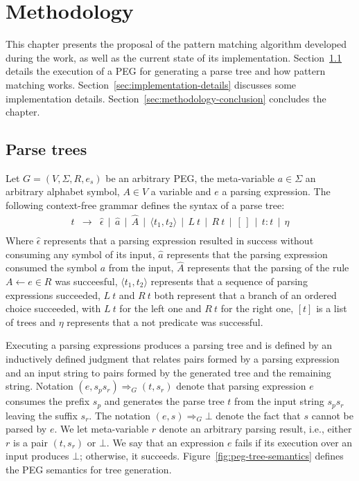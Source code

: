 \chapter{Methodology}\label{chap:methodology}

This chapter presents the proposal of the pattern matching algorithm developed
during the work, as well as the  current state of its implementation.
Section~\ref{sec:parse-tress} details
the execution of a PEG for generating a parse tree and how pattern matching works.
Section~\ref{sec:implementation-details} discusses some implementation details.
Section~\ref{sec:methodology-conclusion} concludes the chapter.

\section{Parse trees}\label{sec:parse-tress}

Let \(G = (V, \Sigma, R, e_s)\) be an arbitrary PEG, the meta-variable \(a \in \Sigma\) an
arbitrary alphabet symbol, \(A \in V\) a variable and \(e\) a parsing expression.
The following context-free grammar defines the syntax of a parse tree:
\[
   \begin{array}{lcl}
      t & \to & \hat{\epsilon} \, \mid \, \hat{a} \, \mid \, \hat{A} \,
                    \mid \, \langle t_1, t_2 \rangle\,
                    \mid \, L \: t \, \mid \, R \: t \, \mid \, [\,] \,\mid\,t:t\,
                    \mid \, \eta \\
   \end{array}
\]
Where \(\hat{\epsilon}\) represents that a parsing expression resulted in
success without consuming any symbol of its input, \(\hat{a}\) represents that
the parsing expression consumed the symbol \(a\) from the input, \(\hat{A}\)
represents that the parsing of the rule \(A \leftarrow e \in R\) was succeesful,
\(\langle t_1, t_2 \rangle\) represents that a sequence of parsing expressions
succeeded,
\(L \: t\) and \(R \: t\) both represent that a branch of an ordered choice succeeded,
with \(L \: t\) for the left one and \(R \: t\) for the right one,
\([t]\) is a list of trees and \(\eta\) represents that a not
predicate was successful.

Executing a parsing expressions produces a parsing tree and is defined by an
inductively defined judgment that relates pairs formed by a parsing expression
and an input string to pairs formed by the generated tree and the remaining string.
Notation \((e,s_ps_r) \Rightarrow_G (t,s_r)\) denote that parsing expression \(e\)
consumes the prefix \(s_p\) and generates the parse tree \(t\) from the input string
\(s_ps_r\) leaving the suffix \(s_r\). The notation \((e,s) \Rightarrow_G \bot\)
denote the fact that \(s\) cannot be parsed by \(e\). We let meta-variable \(r\)
denote an arbitrary parsing result, i.e., either \(r\) is a pair \((t,s_r)\) or
\(\bot\). We say that an expression \(e\) fails if its execution over an input
produces \(\bot\); otherwise, it succeeds. Figure~\ref{fig:peg-tree-semantics}
defines the PEG semantics for tree generation.

